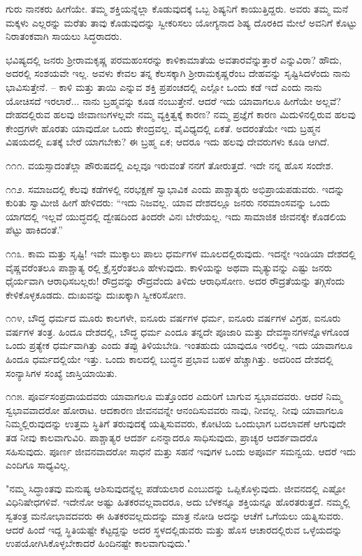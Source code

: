 ಗುರು ನಾನಕರು ಹೀಗೆಯೇ. ತಮ್ಮ ಶಕ್ತಿಯನ್ನೆಲ್ಲಾ ಕೊಡುವುದಕ್ಕೆ ಒಬ್ಬ ಶಿಷ್ಯನಿಗೆ ಕಾಯುತ್ತಿದ್ದರು. ಅವರು ತಮ್ಮ ಮನೆ ಮಕ್ಕಳು ಎಲ್ಲರನ್ನು ಮರೆತು ತಾವು ಕೊಡುವುದನ್ನು ಸ್ವೀಕರಿಸಲು ಯೋಗ್ಯನಾದ ಶಿಷ್ಯ ದೊರಕಿದ ಮೇಲೆ ಅವನಿಗೆ ಕೊಟ್ಟು ನಿರಾತಂಕವಾಗಿ ಸಾಯಲು ಸಿದ್ಧರಾದರು.

ಭವಿಷ್ಯದಲ್ಲಿ ಜನರು ಶ‍್ರೀರಾಮಕೃಷ್ಣ ಪರಮಹಂಸರನ್ನು ಕಾಳಿಕಾಮಾತೆಯ ಅವತಾರವೆನ್ನುತ್ತಾರೆ ಎನ್ನುವಿರಾ? ಹೌದು, ಅದರಲ್ಲಿ ಸಂಶಯವೇ ಇಲ್ಲ. ಅವಳು ಕೇವಲ ತನ್ನ ಕೆಲಸಕ್ಕಾಗಿ ಶ‍್ರೀರಾಮಕೃಷ್ಣರೆಂಬ ದೇಹವನ್ನು ಸೃಷ್ಟಿಸಿದಳೆಂದು ನಾನು ಭಾವಿಸುತ್ತೇನೆ. – ಕಾಳಿ ಮತ್ತು ತಾಯಿ ಎನ್ನುವ ಶಕ್ತಿ ಪ್ರಪಂಚದಲ್ಲಿ ಎಲ್ಲೋ ಒಂದು ಕಡೆ ಇದೆ ಎಂದು ನಾನು ಯೋಚಿಸದೆ ಇರಲಾರೆ... ನಾನು ಬ್ರಹ್ಮವನ್ನು ಕೂಡ ನಂಬುತ್ತೇನೆ. ಆದರೆ ಇದು ಯಾವಾಗಲೂ ಹೀಗೆಯೇ ಅಲ್ಲವೆ? ದೇಹದಲ್ಲಿರುವ ಹಲವು ಜೀವಾಣುಗಳಲ್ಲವೇ ನಮ್ಮ ವ್ಯಕ್ತಿತ್ವಕ್ಕೆ ಕಾರಣ? ನಮ್ಮ ಪ್ರಜ್ಞೆಗೆ ಕಾರಣ ಮಿದುಳಿನಲ್ಲಿರುವ ಹಲವು ಕೇಂದ್ರಗಳೇ ಹೊರತು ಯಾವುದೋ ಒಂದು ಕೇಂದ್ರವಲ್ಲ. ವೈವಿಧ್ಯದಲ್ಲಿ ಏಕತೆ. ಅದರಂತೆಯೇ ಇದು ಬ್ರಹ್ಮನ ವಿಷಯದಲ್ಲಿ ಏತಕ್ಕೆ ಬೇರೆ ಯಾಗಬೇಕು? ಈ ಬ್ರಹ್ಮ ಏಕ; ಆದರೂ ಇದು ಹಲವು ದೇವರುಗಳು ಕೂಡಿ ಆಗಿದೆ.

೧೧೧. ವಯಸ್ಸಾದಂತೆಲ್ಲಾ ಪೌರುಷದಲ್ಲಿ ಎಲ್ಲವೂ ಇರುವಂತೆ ನನಗೆ ತೋರುತ್ತದೆ. ಇದೇ ನನ್ನ ಹೊಸ ಸಂದೇಶ.

೧೧೨. ಸಮಾಜದಲ್ಲಿ ಕೆಲವು ಕಡೆಗಳಲ್ಲಿ ನರಭಕ್ಷಣೆ ಸ್ವಾಭಾವಿಕ ಎಂದು ಪಾಶ್ಚಾತ್ಯರು ಅಭಿಪ್ರಾಯಪಡುವರು. ಇದನ್ನು ಕುರಿತು ಸ್ವಾಮೀಜಿ ಹೀಗೆ ಹೇಳಿದರು: “ಇದು ನಿಜವಲ್ಲ. ಯಾವ ದೇಶದಲ್ಲೂ ಜನರು ನರಮಾಂಸವನ್ನು ಒಂದು ಯಾಗದಲ್ಲಿ ಇಲ್ಲವೆ ಯುದ್ಧದಲ್ಲಿ ದ್ವೇಷದಿಂದ ತಿಂದರೇ ವಿನಃ ಬೇರೆಯಲ್ಲ. ಇದು ಸಾಮಾಜಿಕ ಜೀವನಕ್ಕೇ ಕೊಡಲಿಯ ಪೆಟ್ಟು ಹಾಕಿದಂತೆ.”

೧೧೩. ಕಾಮ ಮತ್ತು ಸೃಷ್ಟಿ! ಇವೇ ಮುಕ್ಕಾಲು ಪಾಲು ಧರ್ಮಗಳ ಮೂಲದಲ್ಲಿರುವುದು. ಇದನ್ನೇ ಇಂಡಿಯಾ ದೇಶದಲ್ಲಿ ವೈಷ್ಣವರೆಂತಲೂ ಪಾಶ್ಚಾತ್ಯ ರಲ್ಲಿ ಕ್ರೈಸ್ತರೆಂತಲೂ ಹೇಳುವುದು. ಕಾಳಿಯನ್ನು ಅಥವಾ ಮೃತ್ಯುವನ್ನು ಎಷ್ಟು ಜನರು ಧೈರ್ಯವಾಗಿ ಆರಾಧಿಸಬಲ್ಲರು! ರೌದ್ರವನ್ನು ರೌದ್ರವೆಂದು ತಿಳಿದು ಆರಾಧಿಸೋಣ. ಅದರ ರೌದ್ರತೆಯನ್ನು ತಗ್ಗಿಸೆಂದು ಕೇಳಿಕೊಳ್ಳಕೂಡದು. ದುಃಖವನ್ನು ದುಃಖಕ್ಕಾಗಿ ಸ್ವೀಕರಿಸೋಣ.

೧೧೪, ಬೌದ್ಧ ಧರ್ಮದ ಮೂರು ಕಾಲಗಳೇ, ಐನೂರು ವರ್ಷಗಳ ಧರ್ಮ, ಐನೂರು ವರ್ಷಗಳ ವಿಗ್ರಹ, ಐನೂರು ವರ್ಷಗಳ ತಂತ್ರ. ಹಿಂದೂ ದೇಶದಲ್ಲಿ, ಬೌದ್ಧ ಧರ್ಮ ಎಂದೂ ತನ್ನದೇ ಪೂಜಾರಿ ಮತ್ತು ದೇವಸ್ಥಾನಗಳನ್ನೊಳಗೊಂಡ ಒಂದು ಪ್ರತ್ಯೇಕ ಧರ್ಮವಾಗಿತ್ತು ಎಂದು ತಪ್ಪು ತಿಳಿಯಬೇಡಿ. ಇಂತಹುದು ಯಾವುದೂ ಇರಲಿಲ್ಲ. ಇದು ಯಾವಾಗಲೂ ಹಿಂದೂ ಧರ್ಮದಲ್ಲಿಯೇ ಇತ್ತು. ಒಂದು ಕಾಲದಲ್ಲಿ ಬುದ್ಧನ ಪ್ರಭಾವ ಬಹಳ ಹೆಚ್ಚಾಗಿತ್ತು. ಅದರಿಂದ ದೇಶದಲ್ಲಿ ಸಂನ್ಯಾಸಿಗಳ ಸಂಖ್ಯೆ ಜಾಸ್ತಿಯಾಯಿತು.

೧೧೫. ಪೂರ್ವಸಂಪ್ರದಾಯದವರು ಯಾವಾಗಲೂ ಮತ್ತೊಂದರ ಎದುರಿಗೆ ಬಾಗುವ ಸ್ವಭಾವದವರು. ಆದರೆ ನಿಮ್ಮ ಸ್ವಭಾವವಾದರೋ ಹೋರಾಟ. ಆದಕಾರಣ ಜೀವನವನ್ನೇ ಆನಂದಿಸುವವರು ನಾವು, ನೀವಲ್ಲ. ನೀವು ಯಾವಾಗಲೂ ನಿಮ್ಮಲ್ಲಿರುವುದನ್ನು ಉತ್ತಮ ಸ್ಥಿತಿಗೆ ತರುವುದಕ್ಕೆ ಯತ್ನಿಸುವವರು, ಕೋಟಿಯ ಒಂದುಭಾಗ ಬದಲಾವಣೆ ಆಗುವುದೇ ತಡ ನೀವು ಕಾಲವಾಗುವಿರಿ. ಪಾಶ್ಚಾತ್ಯರ ಆದರ್ಶ ಏನನ್ನಾದರೂ ಸಾಧಿಸುವುದು, ಪ್ರಾಚ್ಯರ ಆದರ್ಶವಾದರೊ ಸಹಿಸುವುದು. ಪೂರ್ಣ ಜೀವನವಾದರೋ ಸಾಧನೆ ಮತ್ತು ಸಹನೆ ಇವುಗಳ ಒಂದು ಅಪೂರ್ವ ಸಮನ್ವಯ. ಆದರೆ ಇದು ಎಂದಿಗೂ ಸಾಧ್ಯವಿಲ್ಲ.

"ನಮ್ಮ ಸಿದ್ಧಾಂತವು ಮನುಷ್ಯ ಆಶಿಸುವುದನ್ನೆಲ್ಲ ಪಡೆಯಲಾರ ಎಂಬುದನ್ನು ಒಪ್ಪಿಕೊಳ್ಳುವುದು. ಜೀವನದಲ್ಲಿ ಎಷ್ಟೋ ವಿಧಿನಿಷೇಧಗಳಿವೆ. ಇದೇನೋ ಅಷ್ಟು ಹಿತಕರವಲ್ಲವಾದರೂ, ಅದು ಬೆಳಕನ್ನೂ ಶಕ್ತಿಯನ್ನೂ ಹೊರತರುತ್ತದೆ. ನಮ್ಮಲ್ಲಿ ಸ್ವತಂತ್ರ ಮನೋಭಾವದವರು ಈ ಹಿತಕರವಲ್ಲದುದನ್ನು ಮಾತ್ರ ನೋಡಿ ಅದನ್ನು ಆಚೆಗೆ ಒಗೆಯಲು ಯತ್ನಿಸುವರು. ಆದರೆ ಹಿಂದೆ ಇದ್ದ ಸ್ಥಿತಿಯಷ್ಟೇ ಕೆಟ್ಟದ್ದನ್ನು ಅದರ ಸ್ಥಳದಲ್ಲಿಡುವರು ಮತ್ತು ಹೊಸ ಆಚಾರದಲ್ಲಿರುವ ಒಳ್ಳೆಯದನ್ನು ಉಪಯೋಗಿಸಿಕೊಳ್ಳಬೇಕಾದರೆ ಹಿಂದಿನಷ್ಟೇ ಕಾಲವಾಗುವುದು."

